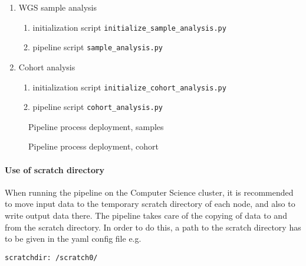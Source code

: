 \documentclass[a4paper]{article}
\begin{document}
\begin{enumerate}
\item WGS sample analysis
  \begin{enumerate}
  \item initialization script \texttt{initialize\_sample\_analysis.py}
  \item pipeline script \texttt{sample\_analysis.py}
  \end{enumerate}

\item Cohort analysis
  \begin{enumerate}
  \item initialization script \texttt{initialize\_cohort\_analysis.py}
  \item pipeline script \texttt{cohort\_analysis.py}
  \end{enumerate}

\end{enumerate}


\begin{figure}
  \begin{center}
    
    \caption[cohort analysis]{Pipeline process deployment, samples}
  \label{fig:pipelineProcessSample}
\end{center}
\end{figure}


\begin{figure}
  \begin{center}
    
    \caption[cohort analysis]{Pipeline process deployment, cohort}
  \label{fig:pipelineProcessCohort}
\end{center}
\end{figure}


\paragraph{Use of scratch directory}

When running the pipeline on the Computer Science cluster, it is
recommended to move input data to the temporary scratch directory of
each node, and also to write output data there. The pipeline takes
care of the copying of data to and from the scratch directory. In
order to do this, a path to the scratch directory has to be given in
the yaml config file e.g.

\begin{lstlisting}
scratchdir: /scratch0/
\end{lstlisting}
\end{document}
